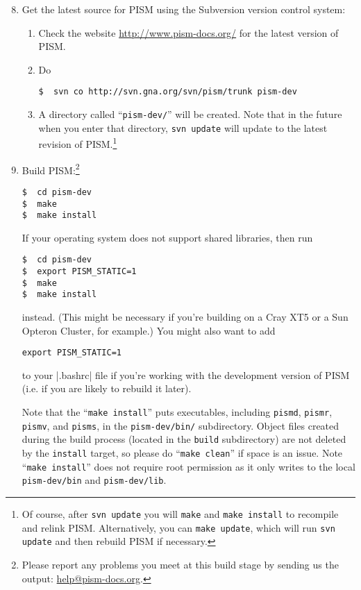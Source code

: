 \documentclass[11pt,final]{amsart}
\renewcommand{\t}[1]{\texttt{#1}}
\begin{document}
\begin{enumerate}\setcounter{enumi}{7}
\item Get the latest source for PISM using the Subversion version control system:
\begin{enumerate}
\item \label{getPISMstep} Check the website \url{http://www.pism-docs.org/} for the latest version of PISM.
\item Do
\begin{verbatim}
$  svn co http://svn.gna.org/svn/pism/trunk pism-dev
\end{verbatim}
\item A directory called ``\verb|pism-dev/|'' will be created.  Note that in the future when you enter that directory, \verb|svn update| will update to the latest revision of PISM.\footnote{Of course, after \t{svn update} you will \t{make} and \t{make install} to recompile and relink PISM. Alternatively, you can \t{make update}, which will run \t{svn update} and then rebuild PISM if necessary.}
\end{enumerate}

\item Build PISM:\footnote{Please report any problems you meet at this build stage by sending us the output: \href{mailto:help@pism-docs.org}{help@pism-docs.org}.}
\begin{verbatim}
$  cd pism-dev
$  make
$  make install
\end{verbatim}

If your operating system does not support shared libraries, then run
\begin{verbatim}
$  cd pism-dev
$  export PISM_STATIC=1
$  make
$  make install
\end{verbatim}
\noindent instead. (This might be necessary if you're building on a Cray XT5 or a Sun Opteron Cluster, for example.) You might also
want to add
\begin{verbatim}
export PISM_STATIC=1
\end{verbatim}
\noindent to your |.bashrc| file if you're working with the development version of PISM (i.e. if you are likely to rebuild it
later).

\noindent  Note that the ``\verb|make install|'' puts executables, including \verb|pismd|, \verb|pismr|, \verb|pismv|, and \verb|pisms|, in the \verb|pism-dev/bin/| subdirectory. Object files created during the build process (located in the \verb|build| subdirectory) are not deleted by the \verb|install| target, so please do ``\verb|make clean|'' if space is an issue. Note ``\verb|make install|'' does not require root permission as it only writes to the local \verb|pism-dev/bin| and \verb|pism-dev/lib|.


\end{enumerate}
\end{document}
